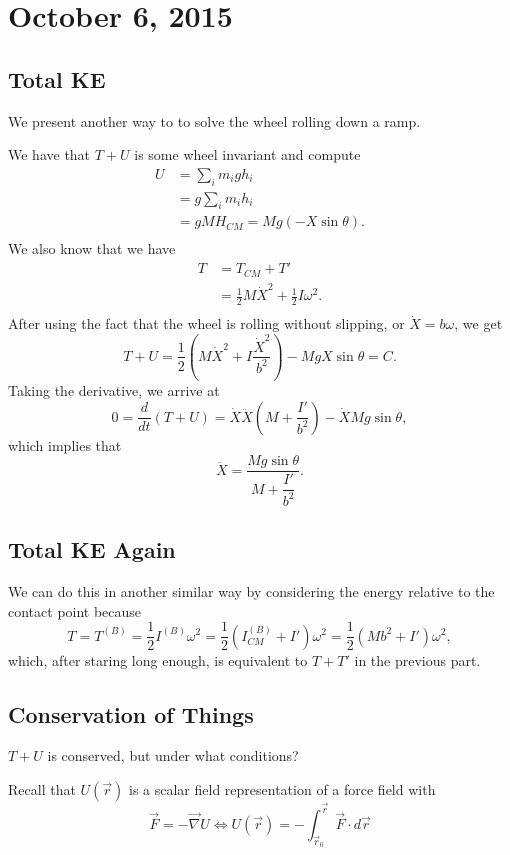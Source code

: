 \section{October 6, 2015}

\subsection{Total KE}
We present another way to to solve the wheel rolling down a ramp.

We have that $T + U$ is some wheel invariant and compute
\[ \begin{aligned}
U &= \sum_i m_i g h_i \\
&= g \sum_i m_i h_i \\
&= g M H_{CM} = Mg(-X\sin\theta). \\
\end{aligned} \]
We also know that we have
\[ \begin{aligned}
T &= T_{CM} + T' \\
&= \frac{1}{2} M \dot{X}^2 + \frac{1}{2} I \omega^2. \\
\end{aligned} \]
After using the fact that the wheel is rolling without slipping, or
$\dot{X} = b \omega$, we get
\[ T + U = \frac{1}{2}\left(M \dot{X}^2 + I \frac{\dot{X}^2}{b^2}\right)
- MgX\sin\theta = C. \]
Taking the derivative, we arrive at
\[ 0 = \frac{d}{dt}(T + U) = \dot{X} \ddot{X}\left(M +
\frac{I'}{b^2}\right) - \dot{X}Mg\sin\theta, \]
which implies that
\[ \ddot{X} = \frac{Mg\sin\theta}{M + \dfrac{I'}{b^2}}. \]

\subsection{Total KE Again}
We can do this in another similar way by considering the energy relative
to the contact point because
\[ T = T^{(B)} = \frac{1}{2}I^{(B)} \omega^2 = \frac{1}{2}(I_{CM}^{(B)}
+ I')\omega^2 = \frac{1}{2}(Mb^2 + I')\omega^2, \]
which, after staring long enough, is equivalent to $T + T'$ in the
previous part.

\subsection{Conservation of Things}
$T + U$ is conserved, but under what conditions?

Recall that $U(\vec{r})$ is a scalar field representation of a force
field with
\[ \vec{F} = - \vec{\nabla}U \iff U(\vec{r}) = -
\int_{\vec{r}_0}^{\vec{r}} \vec{F} \cdot d\vec{r} \]

